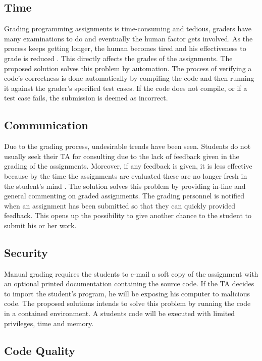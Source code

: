 \subsection*{Time}

Grading programming assignments is time-consuming and tedious, graders have many
examinations to do and eventually the human factor gets involved. As the process
keeps getting longer, the human becomes tired and his effectiveness to grade is
reduced \cite{Cheang2003}. This directly affects the grades of the assignments.
The proposed solution solves this problem by automation. The process of
verifying a code's correctness is done automatically by compiling the code and
then running it against the grader's specified test cases. If the code does not
compile, or if a test case fails, the submission is deemed as incorrect.

\subsection*{Communication}

Due to the grading process, undesirable trends have been seen. Students do not
usually seek their TA for consulting due to the lack of feedback given in the
grading of the assignments. Moreover, if any feedback is given, it is less
effective because by the time the assignments are evaluated these are no longer
fresh in the student's mind \cite{Cheang2003}. The solution solves this problem
by providing in-line and general commenting on graded assignments. The grading
personnel is notified when an assignment has been submitted so that they can
quickly provided feedback. This opens up the possibility to give another chance
to the student to submit his or her work.

\subsection*{Security}

Manual grading requires the students to e-mail a soft copy of the assignment
with an optional printed documentation containing the source code. If the TA
decides to import the student's program, he will be exposing his computer to
malicious code. The proposed solutions intends to solve this problem by running
the code in a contained environment. A students code will be executed with
limited privileges, time and memory.

\subsection*{Code Quality}

